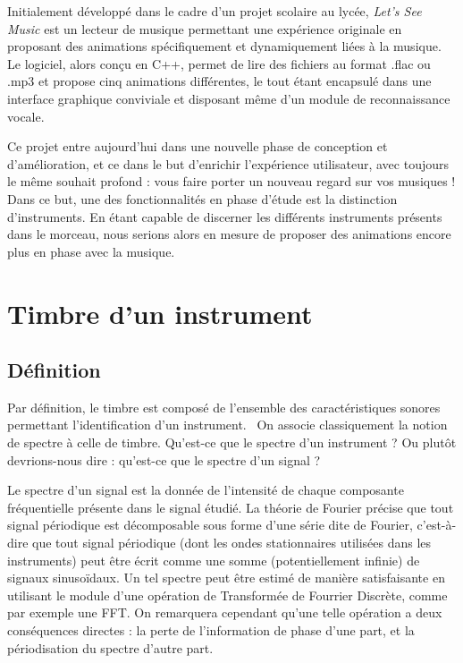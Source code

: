 \documentclass[10pt]{article}
\begin{document}
\begin{multicols}{2}
Initialement développé dans le cadre d'un projet scolaire au lycée, \emph{Let's See Music} est un lecteur de musique permettant une expérience originale en proposant des animations spécifiquement et dynamiquement liées à la musique.
Le logiciel, alors conçu en C++, permet de lire des fichiers au format .flac ou .mp3 et propose cinq animations différentes, le tout étant encapsulé dans une interface graphique conviviale et disposant même d'un module de reconnaissance vocale.

Ce projet entre aujourd'hui dans une nouvelle phase de conception et d'amélioration, et ce dans le but d'enrichir l'expérience utilisateur, avec toujours le même souhait profond : vous faire porter un nouveau regard sur vos musiques !
Dans ce but, une des fonctionnalités en phase d'étude est la distinction d'instruments.
En étant capable de discerner les différents instruments présents dans le morceau, nous serions alors en mesure de proposer des animations encore plus en phase avec la musique.




\label{timbre}
\section{Timbre d'un instrument}



\label{Définition}
\subsection{Définition}

Par définition, le timbre est composé de l'ensemble des caractéristiques sonores permettant l'identification d'un in\-strument.~\cite{Wiki}
On associe classiquement la notion de spectre à celle de timbre.
Qu'est-ce que le spectre d'un instrument ? 
Ou plutôt devrions-nous dire : qu'est-ce que le spectre d'un signal ?

Le spectre d'un signal est la donnée de l'intensité de chaque composante fréquentielle présente dans le signal étudié.
La théorie de Fourier précise que tout signal pé\-riodique est décomposable sous forme d'une série dite de Fourier, c'est-à-dire que tout signal périodique (dont les ondes stationnaires utilisées dans les instruments) peut être écrit comme une somme (potentiellement infinie) de si\-gnaux sinusoïdaux.
Un tel spectre peut être estimé de manière sa\-tisfaisante en utilisant le module d'une opération de Transformée de Fourrier Discrète, comme par exemple une FFT.
On remarquera cependant qu'une telle opération a deux conséquences directes : la perte de l'information de phase d'une part, et la périodisation du spectre d'autre part.~\cite{EPFL}


\end{multicols}
\end{document}
